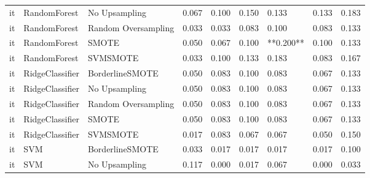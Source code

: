 \begin{tabular}{lllllllll}
      it &                 RandomForest &       No Upsampling & 0.067 &                     0.100 &                 0.150 &                  0.133 &                                   0.133 &     0.183 \\
      it &                 RandomForest & Random Oversampling & 0.033 &                     0.033 &                 0.083 &                  0.100 &                                   0.083 &     0.133 \\
      it &                 RandomForest &               SMOTE & 0.050 &                     0.067 &                 0.100 &              **0.200** &                                   0.100 &     0.133 \\
      it &                 RandomForest &            SVMSMOTE & 0.033 &                     0.100 &                 0.133 &                  0.183 &                                   0.083 &     0.167 \\
      it &              RidgeClassifier &     BorderlineSMOTE & 0.050 &                     0.083 &                 0.100 &                  0.083 &                                   0.067 &     0.133 \\
      it &              RidgeClassifier &       No Upsampling & 0.050 &                     0.083 &                 0.100 &                  0.083 &                                   0.067 &     0.133 \\
      it &              RidgeClassifier & Random Oversampling & 0.050 &                     0.083 &                 0.100 &                  0.083 &                                   0.067 &     0.133 \\
      it &              RidgeClassifier &               SMOTE & 0.050 &                     0.083 &                 0.100 &                  0.083 &                                   0.067 &     0.133 \\
      it &              RidgeClassifier &            SVMSMOTE & 0.017 &                     0.083 &                 0.067 &                  0.067 &                                   0.050 &     0.150 \\
      it &                          SVM &     BorderlineSMOTE & 0.033 &                     0.017 &                 0.017 &                  0.017 &                                   0.017 &     0.100 \\
      it &                          SVM &       No Upsampling & 0.117 &                     0.000 &                 0.017 &                  0.067 &                                   0.000 &     0.033 \\

\end{tabular}
